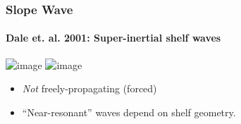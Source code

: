 \documentclass[]{beamer}
\begin{document}
\begin{frame}
  \frametitle{Slope Wave}
  \framesubtitle{Dale et. al. 2001: Super-inertial shelf waves}
  \begin{center}
     \includegraphics<1>[width=0.5\textwidth]{./doc/daleetal01a.png} 
     \includegraphics<2>[width=0.5\textwidth]{./doc/ShelfWIdthConv.png} 
  \end{center}
  \begin{itemize}
    \item<1-> \emph{Not} freely-propagating (forced)
    \item<2> ``Near-resonant'' waves depend on shelf geometry.
  \end{itemize}
\end{frame}
\end{document}
